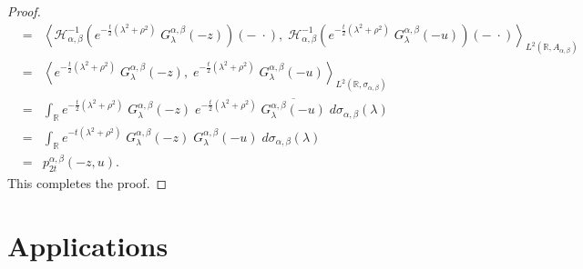 \documentclass[a4paper,11pt, reqno]{amsart}
\theoremstyle{plain}
\theoremstyle{definition}
\theoremstyle{remark}
\def \R{{\mathbb R}}
\def\R{\mathbb R}
\def \H{{\mathcal H}}
\begin{document}
\begin{proof}
\begin{eqnarray*}
& = & \left\langle \H_{\alpha, \beta}^{-1} \left( e^{-\frac{t}{2}\left( \lambda^2+\rho^2\right)}  \; G^{\alpha, \beta}_\lambda(-z)  \right) (- \; \cdot), \; \H_{\alpha, \beta}^{-1} \left( e^{-\frac{t}{2}\left( \lambda^2+\rho^2\right)}  \; G^{\alpha, \beta}_\lambda(-u)  \right) (- \; \cdot)  \right\rangle_{L^2(\R, A_{\alpha, \beta})}  \\
& = & \left\langle  e^{-\frac{t}{2}\left( \lambda^2+\rho^2\right)}  \; G^{\alpha, \beta}_\lambda(-z), \;  e^{-\frac{t}{2}\left( \lambda^2+\rho^2\right)}  \; G^{\alpha, \beta}_\lambda(-u) \right\rangle_{L^2(\R, \sigma_{\alpha, \beta})}\\
& = & \int_{\R} e^{-\frac{t}{2}\left( \lambda^2+\rho^2\right)}  \; G^{\alpha, \beta}_\lambda(-z) \;  e^{-\frac{t}{2}\left( \lambda^2+\rho^2\right)} \; \overline{G^{\alpha, \beta}_\lambda(-u)} \; d\sigma_{\alpha, \beta}(\lambda)\\
& = & \int_{\R} e^{-t \left( \lambda^2+\rho^2\right)}  \; G^{\alpha, \beta}_\lambda(-z) \;  G^{\alpha, \beta}_\lambda(-u) \; d\sigma_{\alpha, \beta}(\lambda)\\
& = & p^{\alpha, \beta}_{2t} (-z,u).
\end{eqnarray*}
This completes the proof.
\end{proof} 


\section{Applications}\label{sec4}
\end{document}
